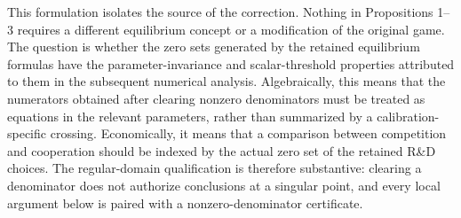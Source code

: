 This formulation isolates the source of the correction. Nothing in Propositions 1--3 requires a different equilibrium concept or a modification of the original game. The question is whether the zero sets generated by the retained equilibrium formulas have the parameter-invariance and scalar-threshold properties attributed to them in the subsequent numerical analysis. Algebraically, this means that the numerators obtained after clearing nonzero denominators must be treated as equations in the relevant parameters, rather than summarized by a calibration-specific crossing. Economically, it means that a comparison between competition and cooperation should be indexed by the actual zero set of the retained R\&D choices. The regular-domain qualification is therefore substantive: clearing a denominator does not authorize conclusions at a singular point, and every local argument below is paired with a nonzero-denominator certificate.
